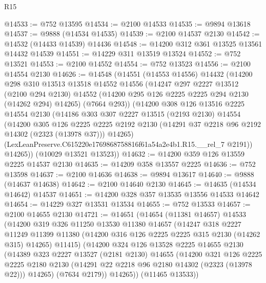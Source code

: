 \begin{lexlean}{R15}
\begin{coremodule}
@14533 := @752 @13595
@14534 := @2100 @14533
@14535 := @9894 @13618
@14537 := @9888 (@14534 @14535)
@14539 := @2100 @14537 @2130
@14542 := @14532 (@14433 @14539) @14436
@14548 := @14200 @312 @361 @13525 @13561 @14432 @14539
@14551 := @14229 @311 @13519 @13524
@14552 := @752 @13521
@14553 := @2100 @14552
@14554 := @752 @13523
@14556 := @2100 @14554 @2130
@14626 := @14548
    (@14551
      (@14553 @14556)
      @14432
      (@14200
        @298
        @310
        @13513
        @13518
        @14552
        @14556
        (@14247
          @297
          @2227
          @13512
          (@2100 @294 @2130)
          @14552
          (@14200 @295 @126 @2225 @2225 @294 @2130 (@14262 @294) @14265)
          (@7664 @293))
        (@14200
          @308
          @126
          @13516
          @2225
          @14554
          @2130
          (@14186
            @303
            @307
            @2227
            @13515
            (@2193 @2130)
            @14554
            (@14200
              @305
              @126
              @2225
              @2225
              @2192
              @2130
              (@14291 @37 @2218 @96 @2192 @14302 (@2323 (@13978 @37)))
              @14265)
            (LexLeanPreserve.C615220e1769868758816f61a54a2e4b1.R15.__rel_7 @2191))
          @14265))
      (@10029 @13521 @13523))
@14632 := @14200 @359 @126 @13559 @2225 @14537 @2130
@14635 := @14209 @358 @13557 @2225
@14636 := @752 @13598
@14637 := @2100 @14636
@14638 := @9894 @13617
@14640 := @9888 (@14637 @14638)
@14642 := @2100 @14640 @2130
@14645 := @14635 (@14534 @14642) @14537
@14651 := @14200 @328 @357 @13535 @13556 @14533 @14642
@14654 := @14229 @327 @13531 @13534
@14655 := @752 @13533
@14657 := @2100 @14655 @2130
@14721 := @14651
    (@14654
      (@11381 @14657)
      @14533
      (@14200
        @319
        @326
        @11250
        @13530
        @11380
        @14657
        (@14247
          @318
          @2227
          @11249
          @11399
          @11380
          (@14200 @316 @126 @2225 @2225 @315 @2130 (@14262 @315) @14265)
          @11415)
        (@14200
          @324
          @126
          @13528
          @2225
          @14655
          @2130
          (@14389
            @323
            @2227
            @13527
            (@2181 @2130)
            @14655
            (@14200
              @321
              @126
              @2225
              @2225
              @2180
              @2130
              (@14291 @22 @2218 @96 @2180 @14302 (@2323 (@13978 @22)))
              @14265)
            (@7634 @2179))
          @14265))
      (@11465 @13533))

\end{coremodule}
\end{lexlean}
